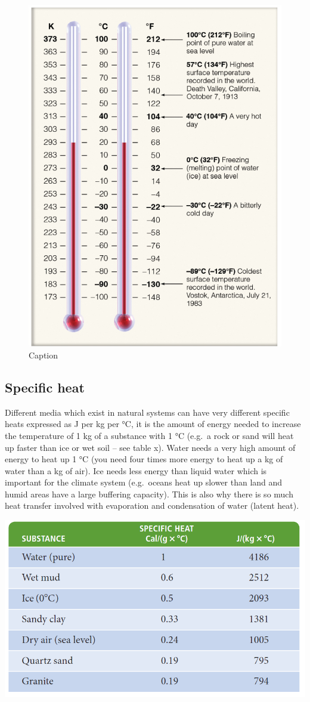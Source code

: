 \documentclass[12pt,oneside]{book}
\begin{document}
\begin{figure}

{\centering \includegraphics[width=0.5\linewidth]{figures/Figure115} 

}

\caption{Caption}\label{fig:Temperature2}
\end{figure}

\subsection{Specific heat}\label{specific-heat}

Different media which exist in natural systems can have very different
specific heats expressed as J per kg per °C, it is the amount of energy
needed to increase the temperature of 1 kg of a substance with 1 °C
(e.g.~a rock or sand will heat up faster than ice or wet soil -- see
table x). Water needs a very high amount of energy to heat up 1 °C (you
need four times more energy to heat up a kg of water than a kg of air).
Ice needs less energy than liquid water which is important for the
climate system (e.g.~oceans heat up slower than land and humid areas
have a large buffering capacity). This is also why there is so much heat
transfer involved with evaporation and condensation of water (latent
heat).

\begin{center}
\label{table:Sheat}

\begin{center}\includegraphics[width=0.8\linewidth]{figures/Table12} \end{center}
\end{center}
\end{document}
